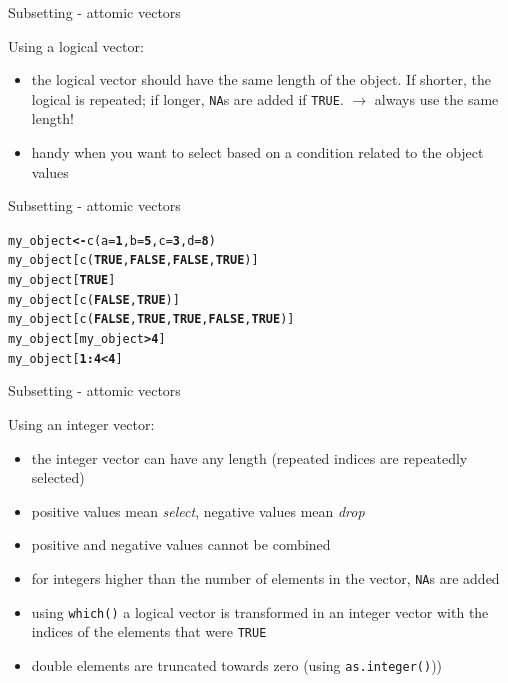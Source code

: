 \documentclass{beamer}\usepackage[]{graphicx}\usepackage[]{color}
\makeatletter
\newcommand{\hlnum}[1]{\textcolor[rgb]{0.502,0,0.502}{\textbf{#1}}}%
\newcommand{\hlopt}[1]{\textcolor[rgb]{1,0,0.502}{\textbf{#1}}}%
\newcommand{\hlstd}[1]{\textcolor[rgb]{0,0,0}{#1}}%
\newcommand{\hlkwb}[1]{\textcolor[rgb]{0.502,0.502,0.753}{\textbf{#1}}}%
\newcommand{\hlkwc}[1]{\textcolor[rgb]{0,0.502,0.753}{#1}}%
\newcommand{\hlkwd}[1]{\textcolor[rgb]{0,0.267,0.4}{#1}}%
\newenvironment{kframe}{%
 \def\at@end@of@kframe{}%
 \ifinner\ifhmode%
  \def\at@end@of@kframe{\end{minipage}}%
  \begin{minipage}{\columnwidth}%
 \fi\fi%
 \def\FrameCommand##1{\hskip\@totalleftmargin \hskip-\fboxsep
 \colorbox{shadecolor}{##1}\hskip-\fboxsep
     \hskip-\linewidth \hskip-\@totalleftmargin \hskip\columnwidth}%
 \MakeFramed {\advance\hsize-\width
   \@totalleftmargin\z@ \linewidth\hsize
   \@setminipage}}%
 {\par\unskip\endMakeFramed%
 \at@end@of@kframe}
\newenvironment{knitrout}{}{} %
\makeatother
\begin{document}
\begin{frame}{Subsetting - attomic vectors}

Using a logical vector:

\begin{itemize}
  \item the logical vector should have the same length of the object. If shorter, the logical is repeated; if longer, \texttt{NA}s are added if \texttt{TRUE}. $\rightarrow$ always use the same length!
  \item handy when you want to select based on a condition related to the object values
\end{itemize}

\end{frame}


\begin{frame}[fragile]{Subsetting - attomic vectors}
\begin{knitrout}
\color{fgcolor}\begin{kframe}
\begin{alltt}
\hlstd{my_object} \hlkwb{<-} \hlkwd{c}\hlstd{(}\hlkwc{a} \hlstd{=} \hlnum{1}\hlstd{,} \hlkwc{b} \hlstd{=} \hlnum{5}\hlstd{,} \hlkwc{c} \hlstd{=} \hlnum{3}\hlstd{,} \hlkwc{d} \hlstd{=} \hlnum{8}\hlstd{)}
\hlstd{my_object[}\hlkwd{c}\hlstd{(}\hlnum{TRUE}\hlstd{,} \hlnum{FALSE}\hlstd{,} \hlnum{FALSE}\hlstd{,} \hlnum{TRUE}\hlstd{)]}
\hlstd{my_object[}\hlnum{TRUE}\hlstd{]}
\hlstd{my_object[}\hlkwd{c}\hlstd{(}\hlnum{FALSE}\hlstd{,} \hlnum{TRUE}\hlstd{)]}
\hlstd{my_object[}\hlkwd{c}\hlstd{(}\hlnum{FALSE}\hlstd{,} \hlnum{TRUE}\hlstd{,} \hlnum{TRUE}\hlstd{,} \hlnum{FALSE}\hlstd{,} \hlnum{TRUE}\hlstd{)]}
\hlstd{my_object[my_object} \hlopt{>} \hlnum{4}\hlstd{]}
\hlstd{my_object[}\hlnum{1}\hlopt{:}\hlnum{4} \hlopt{<} \hlnum{4}\hlstd{]}
\end{alltt}
\end{kframe}
\end{knitrout}

\end{frame}


\begin{frame}{Subsetting - attomic vectors}

Using an integer vector:

\begin{itemize}
  \item the integer vector can have any length (repeated indices are repeatedly selected)
  \item positive values mean \emph{select}, negative values mean \emph{drop}
  \item positive and negative values cannot be combined
  \item for integers higher than the number of elements in the vector, \texttt{NA}s are added
  \item using \texttt{which()} a logical vector is transformed in an integer vector with the indices of the elements that were \texttt{TRUE}
  \item double elements are truncated towards zero (using \texttt{as.integer()}))
\end{itemize}

\end{frame}
\end{document}
